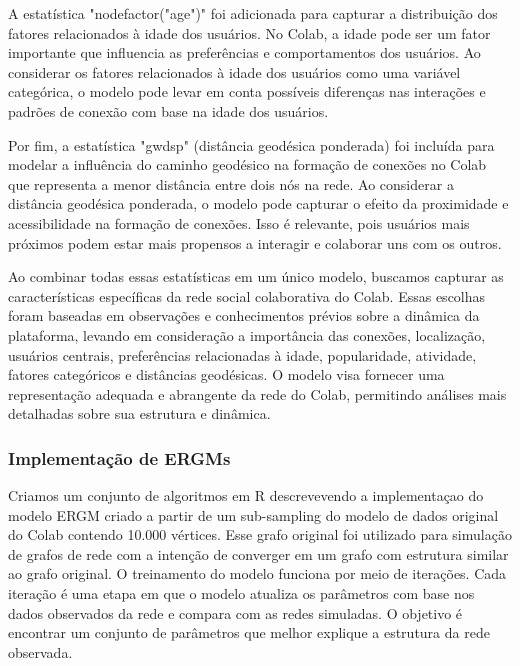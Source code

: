 A estatística "nodefactor("age")" foi adicionada para capturar a distribuição dos fatores relacionados à idade dos usuários. No Colab, a idade pode ser um fator importante que influencia as preferências e comportamentos dos usuários. Ao considerar os fatores relacionados à idade dos usuários como uma variável categórica, o modelo pode levar em conta possíveis diferenças nas interações e padrões de conexão com base na idade dos usuários.

Por fim, a estatística "gwdsp" (distância geodésica ponderada) foi incluída para modelar a influência do caminho geodésico na formação de conexões no Colab que representa a menor distância entre dois nós na rede. Ao considerar a distância geodésica ponderada, o modelo pode capturar o efeito da proximidade e acessibilidade na formação de conexões. Isso é relevante, pois usuários mais próximos podem estar mais propensos a interagir e colaborar uns com os outros.

Ao combinar todas essas estatísticas em um único modelo, buscamos capturar as características específicas da rede social colaborativa do Colab. Essas escolhas foram baseadas em observações e conhecimentos prévios sobre a dinâmica da plataforma, levando em consideração a importância das conexões, localização, usuários centrais, preferências relacionadas à idade, popularidade, atividade, fatores categóricos e distâncias geodésicas. O modelo visa fornecer uma representação adequada e abrangente da rede do Colab, permitindo análises mais detalhadas sobre sua estrutura e dinâmica.

\subsubsection*{Implementação de ERGMs}

Criamos um conjunto de algoritmos em R descrevevendo a implementaçao do modelo ERGM criado a partir de um sub-sampling do modelo de dados original do Colab contendo 10.000 vértices. Esse grafo original foi utilizado para simulação de grafos de rede com a intenção de converger em um grafo com estrutura similar ao grafo original. O treinamento do modelo funciona por meio de iterações. Cada iteração é uma etapa em que o modelo atualiza os parâmetros com base nos dados observados da rede e compara com as redes simuladas. O objetivo é encontrar um conjunto de parâmetros que melhor explique a estrutura da rede observada.

